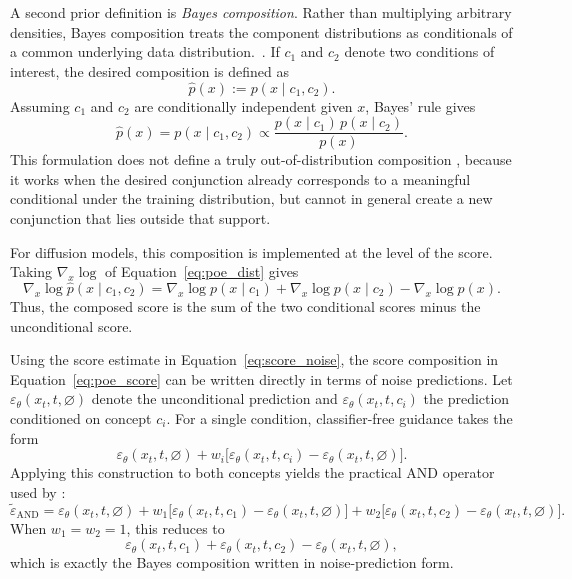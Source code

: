 A second prior definition is \emph{Bayes composition}. 
Rather than multiplying arbitrary densities, Bayes composition treats the component
distributions as conditionals of a common underlying data distribution.~\citep{liu2022compositional,du2023reduce,du2024compositional,NEURIPS2020_49856ed4}.
If \(c_1\) and \(c_2\) denote two conditions of interest, the
desired composition is defined as
\[
    \hat p(x) := p(x \mid c_1, c_2).
\]
Assuming \(c_1\) and \(c_2\) are conditionally independent given \(x\), Bayes' rule gives
\begin{equation}
    \hat p(x)
    = p(x \mid c_1, c_2)
    \propto
    \frac{p(x \mid c_1)\,p(x \mid c_2)}{p(x)}.
    \label{eq:poe_dist}
\end{equation}
This formulation does not define a truly out-of-distribution composition
\citep{mechanisms2025projective}, because it works when the desired conjunction already corresponds
to a meaningful conditional under the training distribution, but cannot in general create a
new conjunction that lies outside that support.

For diffusion models, this composition is implemented at the level of the score.
Taking \(\nabla_x \log\) of Equation~\ref{eq:poe_dist} gives
\begin{equation}
    \nabla_x \log \hat p(x \mid c_1, c_2)
    =
    \nabla_x \log p(x \mid c_1)
    +
    \nabla_x \log p(x \mid c_2)
    -
    \nabla_x \log p(x).
    \label{eq:poe_score}
\end{equation}
Thus, the composed score is the sum of the two conditional scores minus the unconditional
score.

Using the score estimate in Equation~\ref{eq:score_noise}, the score
composition in Equation~\ref{eq:poe_score} can be written directly in terms of noise predictions. Let
\(\varepsilon_\theta(x_t,t,\varnothing)\) denote the unconditional prediction and
\(\varepsilon_\theta(x_t,t,c_i)\) the prediction conditioned on concept \(c_i\). For a
single condition, classifier-free guidance takes the form
\[
    \varepsilon_\theta(x_t,t,\varnothing)
    +
    w_i\bigl[\varepsilon_\theta(x_t,t,c_i)-\varepsilon_\theta(x_t,t,\varnothing)\bigr].
\]
Applying this construction to both concepts yields the practical AND operator used by
\citet{liu2022compositional}:
\begin{equation}
    \tilde\varepsilon_{\mathrm{AND}}
    =
    \varepsilon_\theta(x_t,t,\varnothing)
    +
    w_1\bigl[\varepsilon_\theta(x_t,t,c_1)-\varepsilon_\theta(x_t,t,\varnothing)\bigr]
    +
    w_2\bigl[\varepsilon_\theta(x_t,t,c_2)-\varepsilon_\theta(x_t,t,\varnothing)\bigr].
    \label{eq:and_operator}
\end{equation}
When \(w_1=w_2=1\), this reduces to
\[
    \varepsilon_\theta(x_t,t,c_1)
    +
    \varepsilon_\theta(x_t,t,c_2)
    -
    \varepsilon_\theta(x_t,t,\varnothing),
\]
which is exactly the Bayes composition written in noise-prediction form.

